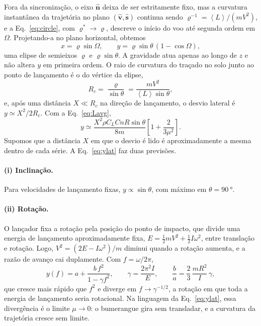 \documentclass[aps,pre,twocolumn,superscriptaddress,nofootinbib,floatfix]{revtex4-2}
\newcommand{\uv}[1]{\hat{\bm{#1}}}
\newcommand{\avg}[1]{\left\langle #1 \right\rangle}
\begin{document}
Fora da sincronização, o eixo $\uv n$ deixa de ser estritamente fixo, mas a curvatura instantânea da trajetória no plano $(\uv v,\uv s)$ continua sendo $\varrho^{-1}=\avg{L}/(mV^2)$, e a Eq.~\eqref{eq:circle}, com $\varrho^\ast\to\varrho$, descreve o início do voo até segunda ordem em $\Omega$. Projetando-a no plano horizontal, obtemos
\begin{equation}
  x = \varrho\sin\Omega, \qquad y = \varrho\sin\theta\,(1-\cos\Omega),
  \label{eq:ellipse}
\end{equation}
uma elipse de semieixos $\varrho$ e $\varrho\sin\theta$. A gravidade atua apenas ao longo de $z$ e não altera $y$ em primeira ordem. O raio de curvatura do traçado no solo junto ao ponto de lançamento é o do vértice da elipse,
\begin{equation}
  R_c = \frac{\varrho}{\sin\theta} = \frac{mV^2}{\avg{L}\sin\theta},
  \label{eq:Rc}
\end{equation}
e, após uma distância $X\ll R_c$ na direção de lançamento, o desvio lateral é $y\simeq X^2/2R_c$. Com a Eq.~\eqref{eq:Lavg},
\begin{equation}
  y \simeq \frac{X^2\rho C_L C n R\sin\theta}{8m}\left[1+\frac{2}{3\mu^2}\right].
  \label{eq:ylat}
\end{equation}
Supomos que a distância $X$ em que o desvio é lido é aproximadamente a mesma dentro de cada série. A Eq.~\eqref{eq:ylat} faz duas previsões.

\paragraph*{(i) Inclinação.} Para velocidades de lançamento fixas, $y\propto\sin\theta$, com máximo em $\theta=\SI{90}{\degree}$.

\paragraph*{(ii) Rotação.} O lançador fixa a rotação pela posição do ponto de impacto, que divide uma energia de lançamento aproximadamente fixa, $E=\tfrac12mV^2+\tfrac12I\omega^2$, entre translação e rotação. Logo, $V^2=(2E-I\omega^2)/m$ diminui quando a rotação aumenta, e a razão de avanço cai duplamente. Com $f=\omega/2\pi$,
\begin{equation}
  y(f) = a + \frac{b\,f^2}{1-\gamma f^2}, \qquad
  \gamma = \frac{2\pi^2 I}{E}, \qquad
  \frac{b}{a} = \frac{2}{3}\,\frac{mR^2}{I}\,\gamma ,
  \label{eq:yspin}
\end{equation}
que cresce mais rápido que $f^2$ e diverge em $f\to\gamma^{-1/2}$, a rotação em que toda a energia de lançamento seria rotacional. Na linguagem da Eq.~\eqref{eq:ylat}, essa divergência é o limite $\mu\to0$: o bumerangue gira sem transladar, e a curvatura da trajetória cresce sem limite.
\end{document}
